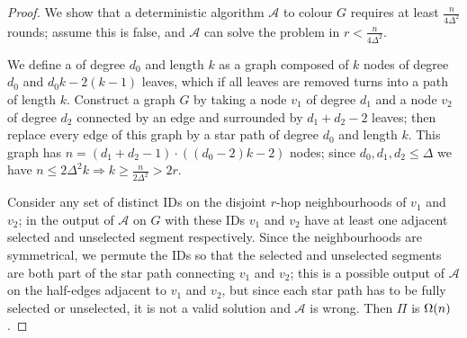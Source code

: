 \documentclass[12pt,a4paper]{article}
\begin{document}
\begin{proof}
    We show that a deterministic algorithm $\mathcal{A}$ to colour $G$ requires at least $\frac{n}{4\Delta^2}$ rounds; assume this is false, and $\mathcal{A}$ can solve the problem in $r< \frac{n}{4\Delta^2}$.
    
    We define a  of degree $d_0$ and length $k$ as a graph composed of $k$ nodes of degree $d_0$ and $d_0k-2(k-1)$ leaves, which if all leaves are removed turns into a path of length $k$. Construct a graph $G$ by taking a node $v_1$ of degree $d_1$ and a node $v_2$ of degree $d_2$ connected by an edge and surrounded by $d_1+d_2-2$ leaves; then replace every edge of this graph by a star path of degree $d_0$ and length $k$. This graph has $n=(d_1+d_2-1)\cdot((d_0-2)k-2)$ nodes; since $d_0,d_1,d_2\leq \Delta$ we have $n\leq 2\Delta^2k\Rightarrow k\geq \frac{n}{2\Delta^2}>2r$.
    
    Consider any set of distinct IDs on the disjoint $r$-hop neighbourhoods of $v_1$ and $v_2$; in the output of $\mathcal{A}$ on $G$ with these IDs $v_1$ and $v_2$ have at least one adjacent selected and unselected segment respectively. Since the neighbourhoods are symmetrical, we permute the IDs so that the selected and unselected segments are both part of the star path connecting $v_1$ and $v_2$; this is a possible output of $\mathcal{A}$ on the half-edges adjacent to $v_1$ and $v_2$, but since each star path has to be fully selected or unselected, it is not a valid solution and $\mathcal{A}$ is wrong. Then $\Pi$ is $\Omega(n)$.
\end{proof}
\end{document}
